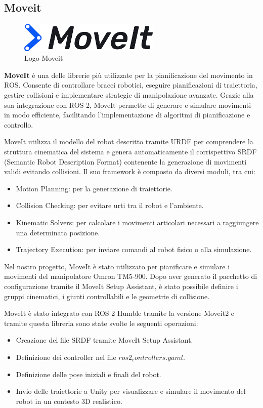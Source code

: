\documentclass[11pt]{report}
\begin{document}
\subsection{Moveit}
\begin{figure}[H]
    \centering
    \includegraphics[width=0.6\textwidth]{images/moveit.png}
    \caption{Logo Moveit}
    \label{fig:moveit}
\end{figure}
\textbf{MoveIt} \cite{Moveit} \cite{Moveit_install} è una delle librerie più utilizzate per la pianificazione del movimento in ROS. Consente di controllare bracci robotici, eseguire pianificazioni di traiettoria, gestire collisioni e implementare strategie di manipolazione avanzate. Grazie alla sua integrazione con ROS 2, MoveIt permette di generare e simulare movimenti in modo efficiente, facilitando l'implementazione di algoritmi di pianificazione e controllo.

MoveIt utilizza il modello del robot descritto tramite URDF per comprendere la struttura cinematica del sistema e genera automaticamente il corrispettivo SRDF (Semantic Robot Description Format) contenente la generazione di movimenti validi evitando collisioni. Il suo framework è composto da diversi moduli, tra cui:
\begin{itemize}
    \item Motion Planning: per la generazione di traiettorie.
    \item Collision Checking: per evitare urti tra il robot e l'ambiente.
    \item Kinematic Solvers: per calcolare i movimenti articolari necessari a raggiungere una determinata posizione.
    \item Trajectory Execution: per inviare comandi al robot fisico o alla simulazione.
\end{itemize}

Nel nostro progetto, MoveIt è stato utilizzato per pianificare e simulare i movimenti del manipolatore Omron TM5-900. Dopo aver generato il pacchetto di configurazione tramite il MoveIt Setup Assistant, è stato possibile definire i gruppi cinematici, i giunti controllabili e le geometrie di collisione.

MoveIt è stato integrato con ROS 2 Humble tramite la versione Moveit2 e tramite questa libreria sono state svolte le seguenti operazioni:
\begin{itemize}
    \item Creazione del file SRDF tramite MoveIt Setup Assistant.

    \item Definizione dei controller nel file $ros2_controllers.yaml$.

    \item Definizione delle pose iniziali e finali del robot.

    \item Invio delle traiettorie a Unity per visualizzare e simulare il movimento del robot in un contesto 3D realistico.
\end{itemize}
\end{document}
